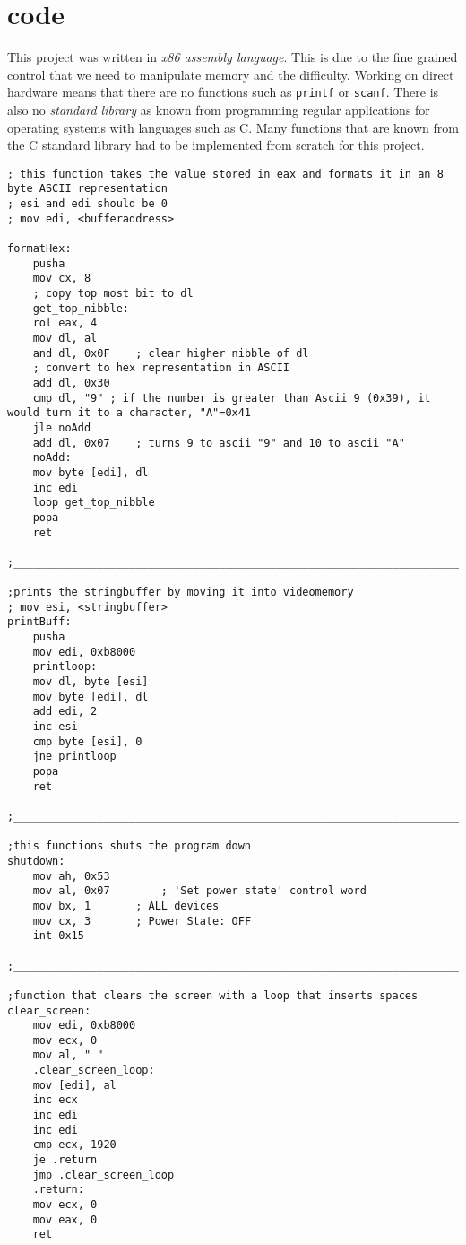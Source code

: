 \section{code}

This project was written in \textit{x86 assembly language}. This is
due to the fine grained control that we need to manipulate memory and
the difficulty. Working on direct hardware means that there are no functions such as \texttt{printf} or \texttt{scanf}. There is also no
\textit{standard library} as known from programming regular applications for operating systems with languages such as C. Many
functions that are known from the C standard library had to be implemented from scratch for this project. 

\begin{lstlisting}[language={[x86masm]Assembler}]
; this function takes the value stored in eax and formats it in an 8 byte ASCII representation
; esi and edi should be 0
; mov edi, <bufferaddress>

formatHex:
	pusha
	mov cx, 8
	; copy top most bit to dl
	get_top_nibble:
	rol eax, 4
	mov dl, al
	and dl, 0x0F	; clear higher nibble of dl
	; convert to hex representation in ASCII
	add dl, 0x30
	cmp dl, "9"	; if the number is greater than Ascii 9 (0x39), it would turn it to a character, "A"=0x41 
	jle noAdd
	add dl, 0x07 	; turns 9 to ascii "9" and 10 to ascii "A"
	noAdd:
	mov byte [edi], dl
	inc edi
	loop get_top_nibble
	popa
	ret

;___________________________________________________________________________________________________________________________________________

;prints the stringbuffer by moving it into videomemory
; mov esi, <stringbuffer>
printBuff:
	pusha
	mov edi, 0xb8000
	printloop:
	mov dl, byte [esi]
	mov byte [edi], dl
	add edi, 2
	inc esi
	cmp byte [esi], 0
	jne printloop
	popa
	ret

;___________________________________________________________________________________________________________________________________________

;this functions shuts the program down
shutdown:	
	mov ah, 0x53
	mov al, 0x07		; 'Set power state' control word
	mov bx, 1 		; ALL devices
	mov cx, 3 		; Power State: OFF
	int 0x15

;___________________________________________________________________________________________________________________________________________

;function that clears the screen with a loop that inserts spaces
clear_screen:
	mov edi, 0xb8000
	mov ecx, 0
	mov al, " "
	.clear_screen_loop:
	mov [edi], al
	inc ecx
	inc edi
	inc edi
	cmp ecx, 1920
	je .return
	jmp .clear_screen_loop
	.return:
	mov ecx, 0
	mov eax, 0
	ret


\end{lstlisting}
